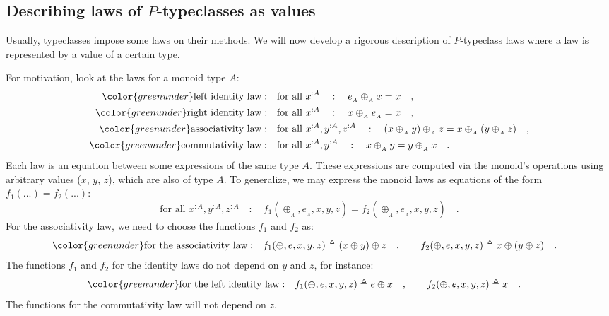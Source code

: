 \subsection{Describing laws of $P$-typeclasses as values\label{subsec:Describing-laws-of-P-typeclasses-as-values}}

Usually, typeclasses impose some laws on their methods. We will now
develop a rigorous description of $P$-typeclass laws where a law
is represented by a value of a certain type.

For motivation, look at the laws for a monoid type $A$:
\begin{align*}
{\color{greenunder}\text{left identity law}:}\quad & \text{for all }x^{:A}\quad:\quad e_{_{A}}\oplus_{_{A}}x=x\quad,\\
{\color{greenunder}\text{right identity law}:}\quad & \text{for all }x^{:A}\quad:\quad x\oplus_{_{A}}e_{_{A}}=x\quad,\\
{\color{greenunder}\text{associativity law}:}\quad & \text{for all }x^{:A},y^{:A},z^{:A}\quad:\quad(x\oplus_{_{A}}y)\oplus_{_{A}}z=x\oplus_{_{A}}(y\oplus_{_{A}}z)\quad,\\
{\color{greenunder}\text{commutativity law}:}\quad & \text{for all }x^{:A},y^{:A}\quad:\quad x\oplus_{_{A}}y=y\oplus_{_{A}}x\quad.
\end{align*}
Each law is an equation between some expressions of the same type
$A$. These expressions are computed via the monoid\textsf{'}s operations using
arbitrary values ($x$, $y$, $z$), which are also of type $A$.
To generalize, we may express the monoid laws as equations of the
form $f_{1}(...)=f_{2}(...)$:
\[
\text{for all }x^{:A},y^{:A},z^{:A}\quad:\quad f_{1}(\oplus_{_{A}},e_{_{A}},x,y,z)=f_{2}(\oplus_{_{A}},e_{_{A}},x,y,z)\quad.
\]
For the associativity law, we need to choose the functions $f_{1}$
and $f_{2}$ as:
\begin{align*}
{\color{greenunder}\text{for the associativity law}:}\quad & f_{1}(\oplus,e,x,y,z)\triangleq(x\oplus y)\oplus z\quad,\quad\quad f_{2}(\oplus,e,x,y,z)\triangleq x\oplus(y\oplus z)\quad.
\end{align*}
The functions $f_{1}$ and $f_{2}$ for the identity laws do not depend
on $y$ and $z$, for instance:
\begin{align*}
{\color{greenunder}\text{for the left identity law}:}\quad & f_{1}(\oplus,e,x,y,z)\triangleq e\oplus x\quad,\quad\quad f_{2}(\oplus,e,x,y,z)\triangleq x\quad.
\end{align*}
The functions for the commutativity law will not depend on $z$.

